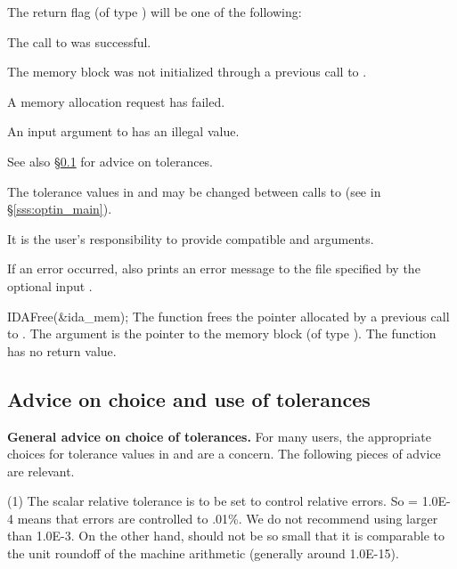 {
  The return flag  (of type ) will be one of the following:
  \begin{args}
  \item[\Id{IDA\_SUCCESS}]
    The call to  was successful.
  \item[\Id{IDA\_MEM\_NULL}] 
    The {\ida} memory block was not initialized through a previous call to
    .
  \item[\Id{IDA\_MEM\_FAIL}] 
    A memory allocation request has failed.
  \item[\Id{IDA\_ILL\_INPUT}] 
    An input argument to  has an illegal value.
  \end{args}
}
{
  See also \S\ref{sss:tol_advice} for advice on tolerances.

  The tolerance values in  and  may be changed between
  calls to  (see  in \S\ref{sss:optin_main}).

  {\warn} It is the user's responsibility to provide compatible  and
   arguments.

  If an error occurred,  also prints an error message to the
  file specified by the optional input .
}
{
  IDAFree(\&ida\_mem);
}
{
  The function  frees the pointer allocated by
  a previous call to .
}
{
  The argument is the pointer to the {\ida} memory block (of type ).
}
{
  The function  has no return value.
}
{}


\subsection{Advice on choice and use of tolerances}\label{sss:tol_advice}

{\bf General advice on choice of tolerances.}
For many users, the appropriate choices for tolerance values in
 and  are a concern.  The following pieces of
advice are relevant.

(1) The scalar relative tolerance  is to be set to control relative
errors.  So  = 1.0E-4 means that errors are controlled to .01\%.  We
do not recommend using  larger than 1.0E-3.  On the other hand,
 should not be so small that it is comparable to the unit roundoff
of the machine arithmetic (generally around 1.0E-15).

